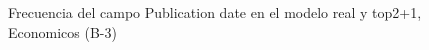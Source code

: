 \begin{figure}[H]
    \centering
    
    \caption{Frecuencia del campo Publication date en el modelo real y top2+1, Economicos (B-3)}
    \label{frecuency-Publication Date-top2+1}
\end{figure}
